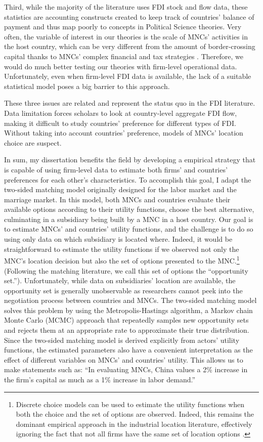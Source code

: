 Third, while the majority of the literature uses FDI stock
and flow data, these statistics are accounting constructs created to keep track
of countries' balance of payment and thus map poorly to concepts in Political
Science theories. Very often, the variable of interest in our theories is the scale of MNCs'
activities in the host country, which can be very different from the amount of
border-crossing capital thanks to MNCs' complex financial and tax strategies
\citep{Kerner2014}. Therefore, we would do much better testing our theories with
firm-level operational data. Unfortunately, even when firm-level FDI data is
available, the lack of a suitable statistical model poses a big barrier to this approach.

These three issues are related and represent the status quo in the FDI
literature. Data limitation forces scholars to look at country-level aggregate
FDI flow, making it difficult to study countries' preference for different types
of FDI. Without taking into account countries' preference, models of MNCs'
location choice are suspect.

In sum, my dissertation benefits the field by developing a empirical strategy that is capable of using firm-level data to estimate both firms' and countries' preferences for
each other's characteristics. To accomplish this goal, I adapt the two-sided
matching model originally designed for the labor market and the marriage market.
In this model, both MNCs and countries evaluate their available options
according to their utility functions, choose the best alternative, culminating
in a subsidiary being built by a MNC in a host country. Our goal is to estimate
MNCs' and countries' utility functions, and the challenge is to do so using only
data on which subsidiary is located where. Indeed, it would be straightforward
to estimate the utility functions if we observed not only the MNC's location decision
but also the set of options presented to the MNC.\footnote{Discrete choice
  models can be used to estimate the utility functions when both the choice and the set of options are observed.
  Indeed, this remains the dominant empirical approach in the industrial location
  literature, effectively ignoring the fact that not all firms have the same set
  of location options \citep{Arauzo-Carod2010}.} (Following the matching
literature, we call this set of options
the ``opportunity set.''). Unfortunately, while data on
subsidiaries' location are available, the opportunity set is generally
unobservable as researchers cannot peek into the negotiation process between
countries and MNCs. The two-sided matching model solves this problem by
using the Metropolis-Hastings algorithm, a Markov chain Monte Carlo (MCMC)
approach that repeatedly samples new opportunity sets and rejects them at an
appropriate rate to approximate their true distribution. Since the two-sided
matching model is derived explicitly from actors' utility functions, the
estimated parameters also have a convenient interpretation as the effect of different
variables on MNCs' and countries' utility. This allows us to make statements
such as: ``In evaluating MNCs, China values a 2\% increase in the firm's capital as much as
a 1\% increase in labor demand.''

